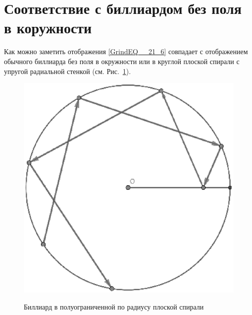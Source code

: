 \documentclass[a4paper]{article}
\begin{document}
\section{Соответствие с биллиардом без поля в коружности}
 Как можно заметить отображения \eqref{GrindEQ__21_6} совпадает с отображением обычного биллиарда без поля в окружности или в круглой плоской спирали с упругой радиальной стенкой (см. Рис.~\ref{ciercle_billiard2_image}). 
\begin{figure}[ht]
  \centering
  \includegraphics[width=.5\linewidth]{ciercle_billiard2_image2}\\
  \caption{Биллиард в полуограниченной по радиусу плоской спирали}\label{ciercle_billiard2_image}
\end{figure}
\end{document}
